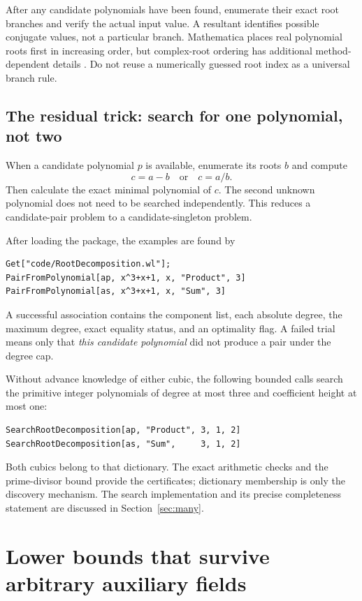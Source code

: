 \documentclass[11pt,a4paper]{article}
\theoremstyle{definition}\newtheorem{definition}[theorem]{Definition}
\theoremstyle{remark}\newtheorem{remark}[theorem]{Remark}
\begin{document}
After any candidate polynomials have been found, enumerate their exact root
branches and verify the actual input value. A resultant identifies possible
conjugate values, not a particular branch. Mathematica places real polynomial
roots first in increasing order, but complex-root ordering has additional
method-dependent details \cite{root}. Do not reuse a numerically guessed
root index as a universal branch rule.

\subsection{The residual trick: search for one polynomial, not two}

When a candidate polynomial $p$ is available, enumerate its roots $b$ and
compute
\[
 c=a-b\quad\text{or}\quad c=a/b.
\]
Then calculate the exact minimal polynomial of $c$. The second unknown
polynomial does not need to be searched independently. This reduces a
candidate-pair problem to a candidate-singleton problem.

After loading the package, the examples are found by
\begin{lstlisting}
Get["code/RootDecomposition.wl"];
PairFromPolynomial[ap, x^3+x+1, x, "Product", 3]
PairFromPolynomial[as, x^3+x+1, x, "Sum", 3]
\end{lstlisting}
A successful association contains the component list, each absolute degree,
the maximum degree, exact equality status, and an optimality flag. A failed
trial means only that \emph{this candidate polynomial} did not produce a
pair under the degree cap.

Without advance knowledge of either cubic, the following bounded calls
search the primitive integer polynomials of degree at most three and
coefficient height at most one:
\begin{lstlisting}
SearchRootDecomposition[ap, "Product", 3, 1, 2]
SearchRootDecomposition[as, "Sum",     3, 1, 2]
\end{lstlisting}
Both cubics belong to that dictionary. The exact arithmetic checks and the
prime-divisor bound provide the certificates; dictionary membership is only
the discovery mechanism. The search implementation and its precise
completeness statement are discussed in Section~\ref{sec:many}.

\section{Lower bounds that survive arbitrary auxiliary fields}
\label{sec:bounds}
\end{document}
